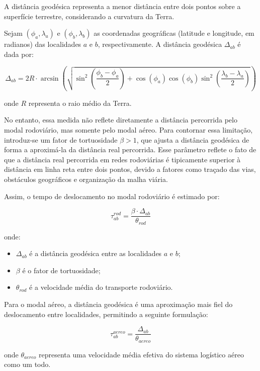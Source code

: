 A distância geodésica representa a menor distância entre dois pontos sobre a superfície terrestre, considerando a curvatura da Terra. 

Sejam $(\phi_a, \lambda_a)$ e $(\phi_b, \lambda_b)$ as coordenadas geográficas (latitude e longitude, em radianos) das localidades $a$ e $b$, respectivamente. A distância geodésica $\Delta_{ab}$ é dada por:

\begin{equation}
\Delta_{ab} = 2R \cdot \arcsin\left( \sqrt{
\sin^2\left(\frac{\phi_b - \phi_a}{2}\right) +
\cos(\phi_a)\cos(\phi_b)\sin^2\left(\frac{\lambda_b - \lambda_a}{2}\right)
} \right)
\end{equation}

onde $R$ representa o raio médio da Terra.

No entanto, essa medida não reflete diretamente a distância percorrida pelo modal rodoviário, mas somente pelo modal aéreo. Para contornar essa limitação, introduz-se um fator de tortuosidade $\beta > 1$, que ajusta a distância geodésica de forma a aproximá-la da distância real percorrida. Esse parâmetro reflete o fato de que a distância real percorrida em redes rodoviárias é tipicamente superior à distância em linha reta entre dois pontos, devido a fatores como traçado das vias, obstáculos geográficos e organização da malha viária.

Assim, o tempo de deslocamento no modal rodoviário é estimado por:

\[
\tau_{ab}^{rod} = \frac{\beta \cdot \Delta_{ab}}{\theta_{rod}}
\]

onde:
\begin{itemize}
    \item $\Delta_{ab}$ é a distância geodésica entre as localidades $a$ e $b$;
    \item $\beta$ é o fator de tortuosidade;
    \item $\theta_{rod}$ é a velocidade média do transporte rodoviário.
\end{itemize}

Para o modal aéreo, a distância geodésica é uma aproximação mais fiel do deslocamento entre localidades, permitindo a seguinte formulação:

\[
\tau_{ab}^{aereo} = \frac{\Delta_{ab}}{\theta_{aereo}}
\]

onde $\theta_{aereo}$ representa uma velocidade média efetiva do sistema logístico aéreo como um todo. 


